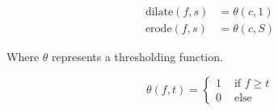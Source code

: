\begin{equation}
    \begin{aligned}
        \text{dilate}(f,s) &= \theta(c,1) \\
        \text{erode}(f,s) &= \theta(c,S) 
    \end{aligned}
    \label{eq:dilation-erosion}
\end{equation}

Where $\theta$ represents a thresholding function.

\begin{equation}
    \theta (f,t) = \begin{cases}
        1 &\text{ if } f\ge t \\
        0 &\text{ else}
    \end{cases}
\end{equation}
